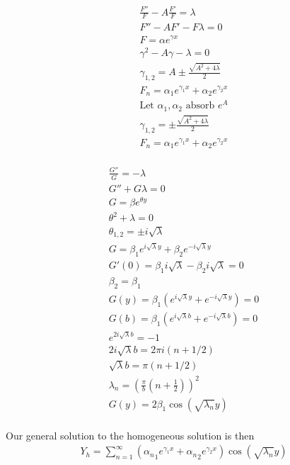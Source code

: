 \documentclass[11pt]{article}
\begin{document}
\noindent\begin{minipage}[b]{.5\linewidth}\centering
\begin{equation}\begin{aligned}
\frac{F''}{F} - A \frac{F'}{F} = \lambda \\
F'' - A F' - F \lambda = 0 \\
F = \alpha e^{\gamma x} \\
\gamma^2 - A \gamma - \lambda = 0 \\
\gamma_{1,2} = A \pm \frac{\sqrt{A^2 + 4\lambda}}{2} \\
F_n = \alpha_1 e^{\gamma_1 x} + \alpha_2 e^{\gamma_2 x} \\
\text{Let $\alpha_1,\alpha_2$ absorb $e^{A}$} \\
\gamma_{1,2} = \pm \frac{\sqrt{A^2 + 4\lambda}}{2} \\
F_n = \alpha_1 e^{\gamma_1 x} + \alpha_2 e^{\gamma_2 x} \\
\end{aligned} \end{equation}
\end{minipage}
\noindent\begin{minipage}[b]{.5\linewidth}\centering
\begin{equation}\begin{aligned}
\frac{G''}{G} = - \lambda \\
G'' + G \lambda = 0 \\
G = \beta e^{\theta y} \\
\theta^2 + \lambda = 0 \\
\theta_{1,2} = \pm i \sqrt{\lambda} \\
G = \beta_1 e^{i \sqrt{\lambda} y} + \beta_2 e^{-i \sqrt{\lambda} y} \\
G'(0) = \beta_1 i \sqrt{\lambda} - \beta_2 i \sqrt{\lambda} = 0 \\
\beta_2 = \beta_1 \\
G(y) = \beta_1 (e^{ i \sqrt{\lambda} y} + e^{-i \sqrt{\lambda} y}) = 0 \\
G(b) = \beta_1 (e^{ i \sqrt{\lambda} b} + e^{-i \sqrt{\lambda} b}) = 0 \\
                e^{2i \sqrt{\lambda} b} = -1 \\
2i \sqrt{\lambda} b = 2 \pi i (n+1/2) \\
   \sqrt{\lambda} b =   \pi   (n+1/2) \\
\lambda_n  = \left(\frac{\pi}{b} \left( n+\frac{1}{2} \right) \right)^2 \\
G(y) = 2 \beta_1 \cos(\sqrt{\lambda_n} y) \\
\end{aligned} \end{equation}
\end{minipage}
Our general solution to the homogeneous solution is then
\begin{equation}\begin{aligned}
Y_h = \sum_{n=1}^{\infty} \left( {\alpha_n}_1 e^{\gamma_1 x} + {\alpha_n}_2 e^{\gamma_2 x} \right) \cos(\sqrt{\lambda_n} y) \\
\end{aligned} \end{equation}
\end{document}
